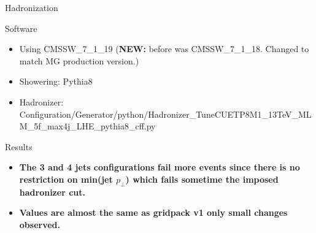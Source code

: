 \documentclass[8pt]{beamer}
\begin{document}
\begin{frame}{Hadronization}

\begin{block}{Software}

  \begin{itemize}
    \item Using CMSSW\_7\_1\_19 (\textbf{NEW:} before was CMSSW\_7\_1\_18. Changed to match MG production version.)
    \item Showering: Pythia8
    \item Hadronizer: \tiny{Configuration/Generator/python/Hadronizer\_TuneCUETP8M1\_13TeV\_MLM\_5f\_max4j\_LHE\_pythia8\_cff.py}
  \end{itemize}

\end{block}

\begin{block}{Results}




\end{block}

\begin{itemize}
  \item[] \textbf{The 3 and 4 jets configurations fail more events since there is no restriction on min(jet $p_\perp$) which fails sometime the imposed hadronizer cut.}
  \item[] \textbf{Values are almost the same as gridpack v1 only small changes observed.}
\end{itemize}

\end{frame}
\end{document}
